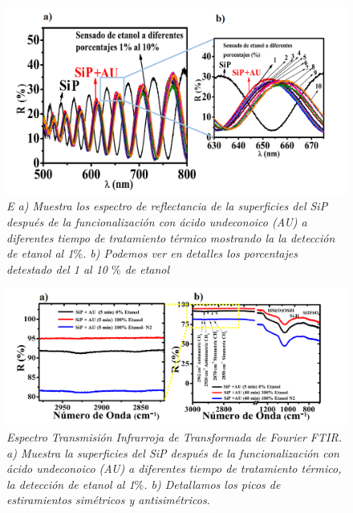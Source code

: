 \documentclass[a4paper,11pt,]{book}
\begin{document}
\begin{figure}[H]
	\centering
	\includegraphics[scale=.4]{../Images/senso01}
	\caption{\emph{E a) Muestra los espectro de reflectancia de la   superficies del SiP después de la funcionalización con ácido undeconoico (AU) a diferentes tiempo de tratamiento térmico mostrando la la detección de etanol al 1$\%$. b) Podemos ver en detalles los porcentajes detestado del 1 al 10 $\%$ de etanol}}
	\label{fig:MCR1}
\end{figure}

\begin{figure}[H]
	\centering
	\includegraphics[scale=.4]{../Images/senso2}
\caption{\emph{Espectro Transmisión Infrarroja de Transformada de Fourier FTIR. a) Muestra la superficies del SiP después de la funcionalización con ácido undeconoico (AU) a diferentes tiempo de tratamiento térmico, la detección de etanol al 1$\%$. b) Detallamos los picos de estiramientos simétricos y antisimétricos.}}
\end{figure} 
\end{document}
